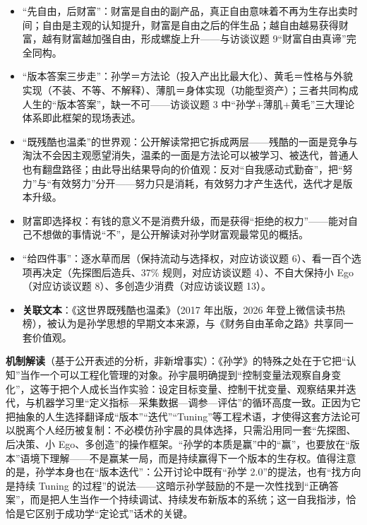 \begin{itemize}
\item
  ``先自由，后财富''：财富是自由的副产品，真正自由意味着不再为生存出卖时间；自由是主观的认知提升，财富是自由之后的伴生品；越自由越易获得财富，越有财富越加强自由，形成螺旋上升------与访谈议题
  9``财富自由真谛''完全同构。
\item
  ``版本答案三步走''：孙学＝方法论（投入产出比最大化）、黄毛＝性格与外貌实现（不装、不等、不解释）、薄肌＝身体实现（功能型资产）；三者共同构成人生的``版本答案''，缺一不可------访谈议题
  3 中``孙学+薄肌+黄毛''三大理论体系即此框架的现场表述。
\item
  ``既残酷也温柔''的世界观：公开解读常把它拆成两层------残酷的一面是竞争与淘汰不会因主观愿望消失，温柔的一面是方法论可以被学习、被迭代，普通人也有翻盘路径；由此导出结果导向的价值观：反对``自我感动式勤奋''，把``努力''与``有效努力''分开------努力只是消耗，有效努力才产生迭代，迭代才是版本升级。
\item
  财富即选择权：有钱的意义不是消费升级，而是获得``拒绝的权力''------能对自己不想做的事情说``不''，是公开解读对孙学财富观最常见的概括。
\item
  ``给四件事''：逐水草而居（保持流动与选择权，对应访谈议题
  6）、看一百个选项再决定（先探图后造兵、37\% 规则，对应访谈议题
  4）、不自大保持小 Ego（对应访谈议题 8）、多创造少消费（对应访谈议题
  13）。
\item
  \textbf{关联文本}：《这世界既残酷也温柔》（2017 年出版，2026
  年登上微信读书热榜），被认为是孙学思想的早期文本来源，与《财务自由革命之路》共享同一套价值观。
\end{itemize}

\textbf{机制解读}（基于公开表述的分析，非新增事实）：《孙学》的特殊之处在于它把``认知''当作一个可以工程化管理的对象。孙宇晨明确提到``控制变量法观察自身变化''，这等于把个人成长当作实验：设定目标变量、控制干扰变量、观察结果并迭代，与机器学习里``定义指标---采集数据---调参---评估''的循环高度一致。正因为它把抽象的人生选择翻译成``版本''``迭代''``Tuning''等工程术语，才使得这套方法论可以脱离个人经历被复制：不必模仿孙宇晨的具体选择，只需沿用同一套``先探图、后决策、小
Ego、多创造''的操作框架。``孙学的本质是赢''中的``赢''，也要放在``版本''语境下理解------不是赢某一局，而是持续赢得下一个版本的生存权。值得注意的是，孙学本身也在``版本迭代''：公开讨论中既有``孙学
2.0''的提法，也有``找方向是持续 Tuning
的过程''的说法------这暗示孙学鼓励的不是一次性找到``正确答案''，而是把人生当作一个持续调试、持续发布新版本的系统；这一自我指涉，恰恰是它区别于成功学``定论式''话术的关键。

